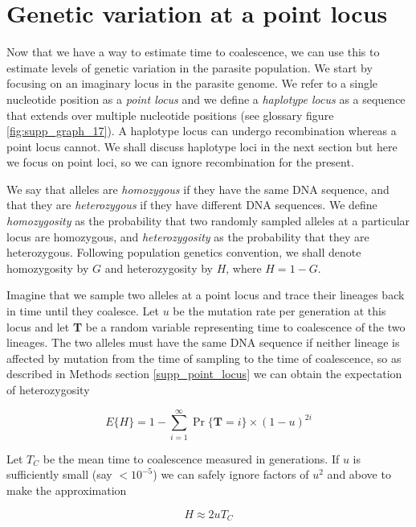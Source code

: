 \documentclass[_main.tex]{subfiles}
\begin{document}
\section*{Genetic variation at a point locus} 
\label{main_point_locus}

Now that we have a way to estimate time to coalescence, we can use this to estimate levels of genetic variation in the parasite population.  We start by focusing on an imaginary locus in the parasite genome.  We refer to a single nucleotide position as a \textit{point locus} and we define a \textit{haplotype locus} as a sequence that extends over multiple nucleotide positions (see glossary figure \ref{fig:supp_graph_17}).  A haplotype locus can undergo recombination whereas a point locus cannot.  We shall discuss haplotype loci in the next section but here we focus on point loci, so we can ignore recombination for the present.

We say that alleles are \textit{homozygous} if they have the same DNA sequence, and that they are \textit{heterozygous} if they have different DNA sequences.  We define \textit{homozygosity} as the probability that two randomly sampled alleles at a particular locus are homozygous, and \textit{heterozygosity} as the probability that they are heterozygous.  Following population genetics convention, we shall denote homozygosity by $G$ and heterozygosity by $H$, where $H = 1 - G$.

Imagine that we sample two alleles at a point locus and trace their lineages back in time until they coalesce.  Let $u$ be the mutation rate per generation at this locus and let \textbf{T} be a random variable representing time to coalescence of the two lineages.  The two alleles must have the same DNA sequence if neither lineage is affected by mutation from the time of sampling to the time of coalescence, so as described in Methods section \ref{supp_point_locus} we can obtain the expectation of heterozygosity

\begin{equation*}
E\{ H \} = 1 - \sum_{i=1}^\infty \Pr \{ \textbf{T} = i \} \times (1-u)^{2i}
\label{eq:main_het_pdf}
\end{equation*}

Let $T_C$ be the mean time to coalescence measured in generations.  If $u$ is sufficiently small (say $<10^{-5}$) we can safely ignore factors of $u^2$ and above to make the approximation

\begin{equation}
H \approx 2 u T_C
\label{eq:main_het_approx}
\end{equation}
\end{document}
